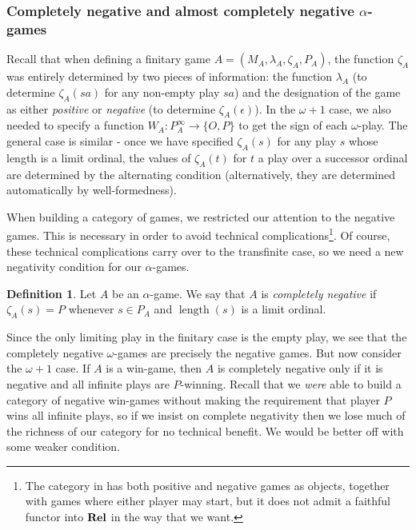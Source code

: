 \documentclass[11pt]{article} %
\theoremstyle{plain} %
\theoremstyle{definition} %
\newtheorem{definition}[theorem]{Definition}
\theoremstyle{note}
\theoremstyle{exercisestyle}
\newcommand{\catname}[1]{{\normalfont\textbf{#1}}}
\newcommand{\Rel}{\catname{Rel}}
\newcommand*\from{\colon}
\newcommand{\cmap}[3]{#1\from{}#2\to{}#3}
\newcommand{\OP}{\{O,P\}}
\newcommand{\emptyplay}{\epsilon}
\DeclareMathOperator{\length}{length}
\begin{document}
\subsubsection{Completely negative and almost completely negative $\alpha$-games}

Recall that when defining a finitary game $A=(M_A,\lambda_A,\zeta_A,P_A)$, the function $\zeta_A$ was entirely determined by two pieces of information: the function $\lambda_A$ (to determine $\zeta_A(sa)$ for any non-empty play $sa$) and the designation of the game as either \emph{positive} or \emph{negative} (to determine $\zeta_A(\emptyplay)$).  In the $\omega+1$ case, we also needed to specify a function $\cmap{W_A}{P_A^\infty}{\OP}$ to get the sign of each $\omega$-play.  The general case is similar - once we have specified $\zeta_A(s)$ for any play $s$ whose length is a limit ordinal, the values of $\zeta_A(t)$ for $t$ a play over a successor ordinal are determined by the alternating condition (alternatively, they are determined automatically by well-formedness).  

When building a category of games, we restricted our attention to the negative games.  This is necessary in order to avoid technical complications\footnote{The category in \cite{abramskyjagadeesangames} has both positive and negative games as objects, together with games where either player may start, but it does not admit a faithful functor into $\Rel$ in the way that we want.}.  Of course, these technical complications carry over to the transfinite case, so we need a new negativity condition for our $\alpha$-games.

\begin{definition}
  Let $A$ be an $\alpha$-game.  We say that $A$ is \emph{completely negative} if $\zeta_A(s)=P$ whenever $s\in P_A$ and $\length(s)$ is a limit ordinal.
\end{definition}

Since the only limiting play in the finitary case is the empty play, we see that the completely negative $\omega$-games are precisely the negative games.  But now consider the $\omega+1$ case.  If $A$ is a win-game, then $A$ is completely negative only if it is negative and all infinite plays are $P$-winning.  Recall that we \emph{were} able to build a category of negative win-games without making the requirement that player $P$ wins all infinite plays, so if we insist on complete negativity then we lose much of the richness of our category for no technical benefit.  We would be better off with some weaker condition.
\end{document}
